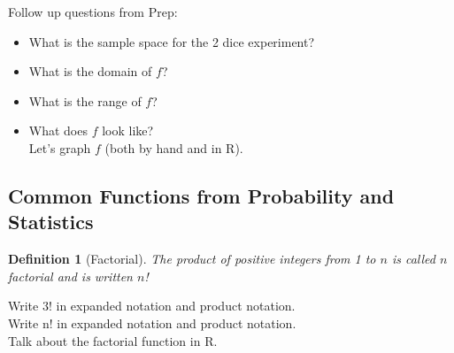 \documentclass{article}
\theoremstyle{plain}
\theoremstyle{box}
\newtheorem*{definition*}{Definition}
\begin{document}
Follow up questions from Prep:
\begin{itemize}
\item What is the sample space for the 2 dice experiment?
\item What is the domain of $f$?
\item What is the range of $f$?
\item What does $f$ look like?\\
Let's graph $f$ (both by hand and in R).
\end{itemize}
 

 



\newpage
\subsection{Common Functions from Probability and Statistics}
\begin{definition*}[Factorial]
The product of positive integers from 1 to $n$ is called $n$ factorial and is written $n$!
\end{definition*}

\noindent Write 3! in expanded notation and product notation.\\
Write n! in expanded notation and product notation.\\
Talk about the factorial function in R.
\end{document}
